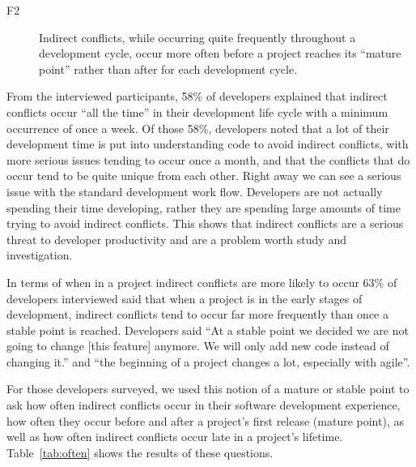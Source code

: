 \documentclass[conference]{IEEEtran}
\makeatletter
\def\namedlabel#1#2{\begingroup
   \def\@currentlabel{#2}%
   \label{#1}\endgroup
}
\makeatother
\begin{document}
\begin{description}
	\item[F2\namedlabel{itm:f2}{F2}] Indirect conflicts, while occurring quite frequently throughout a development cycle,
						occur more often before a project reaches its ``mature point'' rather than after for each development cycle.
\end{description}

From the interviewed participants, 58\% of developers explained that indirect conflicts occur ``all the time'' in
their development life cycle with a minimum occurrence of once a week. Of those 58\%, developers noted that a
lot of their development time is put into understanding code to avoid indirect conflicts, with more serious issues tending
to occur once a month, and that the conflicts that do occur tend to be quite unique from each other. Right away we can see a serious issue with the standard
development work flow. Developers are not actually spending their time developing, rather they are spending large amounts of time trying to avoid indirect
conflicts. This shows that indirect conflicts are a serious threat to developer productivity and are a problem worth study and investigation.

In terms of when in a project indirect conflicts are more likely to occur 63\% of developers interviewed said that
when a project is in the early stages of development, indirect conflicts tend to occur far more frequently
than once a stable point is reached. Developers said ``At a stable point we decided we are not going to change
[this feature] anymore. We will only add new code instead of changing it.'' and ``the beginning of a project 
changes a lot, especially with agile''.

For those developers surveyed, we used this notion of a mature or stable point to ask how often indirect conflicts occur in their software development experience,
how often they occur before and after a project's first release (mature point), as well as how often indirect conflicts occur late
in a project's lifetime. Table~\ref{tab:often} shows the results of these questions.
\end{document}
